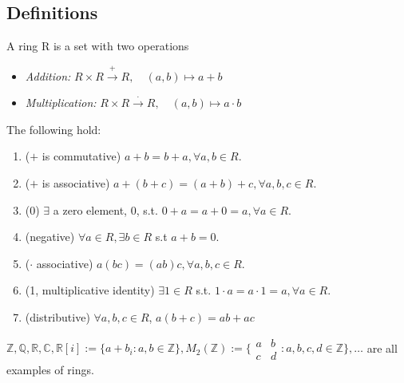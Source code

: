 \documentclass[12pt,oneside]{article}
\begin{document}
\subsection{Definitions}

\begin{definition}[Ring]
  A ring R is a set with two operations\footnotemark
  \begin{itemize}
    \item \emph{Addition:} $R \times R \overset{+}{\longrightarrow} R, \quad (a,b) \mapsto a+b$
    \item \emph{Multiplication:} $R \times R \overset{\cdot}{\longrightarrow} R, \quad (a,b) \mapsto a \cdot b$
  \end{itemize}

  The following hold:
  \begin{enumerate}
    \item ($+$ is commutative) $a + b = b+a, \forall a,b \in R$.
    \item ($+$ is associative) $a + (b+c) = (a+b) +c, \forall a,b,c \in R$.
    \item (0) $\exists$ a zero element, 0, s.t. $0 + a = a + 0 = a, \forall a \in R$.
    \item (negative) $\forall a \in R, \exists b \in R$ s.t $a+b = 0$.
    \item ($\cdot$ associative) $a(bc) = (ab)c, \forall a,b,c \in R$.
    \item (1, multiplicative identity) $\exists 1 \in R$ s.t. $1 \cdot a = a \cdot 1 = a, \forall a \in R$.\footnotemark
    \item (distributive) $\forall a,b,c \in R$, $a(b+c) = ab + ac$
  \end{enumerate}

  $\mathbb{Z}, \mathbb{Q}, \mathbb{R}, \mathbb{C}, \mathbb{R}[i] := \{a + b_i: a,b \in \mathbb{Z}\}, M_2(\mathbb{Z}) := \{\begin{matrix}
  a & b\\
  c & d
  \end{matrix} : a,b,c,d \in \mathbb{Z}\}, \dots$ are all examples of rings.

\end{definition}
\end{document}
